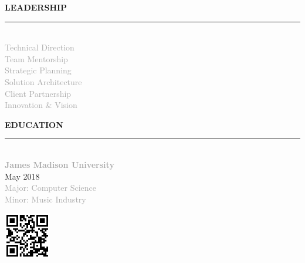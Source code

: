 \documentclass[10pt,letterpaper]{article}
\newcommand{\sidebarheader}[1]{%
    \vspace{6pt}
    {\headingfont\small\textcolor{accent}{\MakeUppercase{\textbf{#1}}}}
    \vspace{1pt}
    \par\noindent\textcolor{accent}{\rule{\linewidth}{1.5pt}}
    \vspace{2pt}
}
\begin{document}
{\begin{minipage}[t][10.885in][t]{2.7in}
\begin{minipage}{2.1in}
\sidebarheader{Leadership}
{\scriptsize\textcolor{darkgray}{\\[-6pt]
Technical Direction\\[3pt]
Team Mentorship\\[3pt]
Strategic Planning\\[3pt]
Solution Architecture\\[3pt]
Client Partnership\\[3pt]
Innovation \& Vision\\[3pt]
}}

\sidebarheader{Education}
{\footnotesize\\[-6pt]
\textbf{\textcolor{darkgray}{James Madison University}}\\[3pt]
\textcolor{mediumgray}{May 2018}\\[3pt]
\textcolor{darkgray}{Major: Computer Science\\[3pt]
Minor: Music Industry\\[3pt]}
}

\vfill

\vspace{110pt}
\raggedright
\includegraphics[width=0.8in]{qr_code.png}\\[3pt]

\vspace{10pt}

\end{minipage}
\end{minipage}%
}%
\hspace{0pt}%
\end{document}
